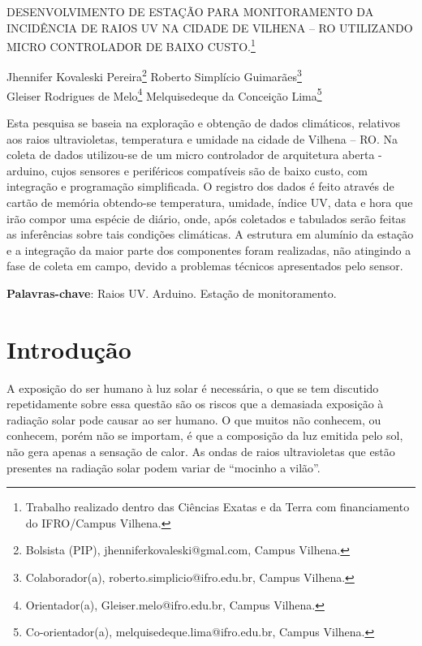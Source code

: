 \documentclass[article,12pt,onesidea,4paper,english,brazil]{abntex2}
\begin{document}
	
	
	\frenchspacing 
	
	\begin{center}
		\LARGE DESENVOLVIMENTO DE ESTAÇÃO PARA MONITORAMENTO DA INCIDÊNCIA DE RAIOS UV NA CIDADE DE VILHENA – RO UTILIZANDO MICRO CONTROLADOR DE BAIXO CUSTO.\footnote{Trabalho realizado dentro das Ciências Exatas e da Terra com financiamento do IFRO/Campus Vilhena.}
		
		\normalsize
		Jhennifer Kovaleski Pereira\footnote{Bolsista (PIP), jhenniferkovaleski@gmal.com, Campus Vilhena.} 
		Roberto Simplício Guimarães\footnote{ Colaborador(a), roberto.simplicio@ifro.edu.br, Campus Vilhena.} \\
	Gleiser Rodrigues de Melo\footnote{ Orientador(a), Gleiser.melo@ifro.edu.br, Campus Vilhena.} 
		Melquisedeque da Conceição Lima\footnote{Co-orientador(a), melquisedeque.lima@ifro.edu.br, Campus Vilhena.} 
	\end{center}
	
	\begin{resumoumacoluna}
	Esta pesquisa se baseia na exploração e obtenção de dados climáticos, relativos aos raios ultravioletas, temperatura e umidade na cidade de Vilhena – RO. Na coleta de dados utilizou-se de um micro controlador de arquitetura aberta - arduino, cujos sensores e periféricos compatíveis são de baixo custo, com integração e programação simplificada. O registro dos dados é feito através de cartão de memória obtendo-se temperatura, umidade, índice UV, data e hora que irão compor uma espécie de diário, onde, após coletados e tabulados serão feitas as inferências sobre tais condições climáticas. A estrutura em alumínio da estação e a integração da maior parte dos componentes foram realizadas, não atingindo a fase de coleta em campo, devido a problemas técnicos apresentados pelo sensor.	
		
		\vspace{\onelineskip}
		
		\noindent
		\textbf{Palavras-chave}: Raios UV. Arduino. Estação de monitoramento.
	\end{resumoumacoluna}
	
	\section*{Introdução}
	
	A exposição do ser humano à luz solar é necessária, o que se tem discutido repetidamente sobre essa questão são os riscos que a demasiada exposição à radiação solar pode causar ao ser humano. O que muitos não conhecem, ou conhecem, porém não se importam, é que a composição da luz emitida pelo sol, não gera apenas a sensação de calor. As ondas de raios ultravioletas que estão presentes na radiação solar podem variar de “mocinho a vilão”.
	
\end{document}
